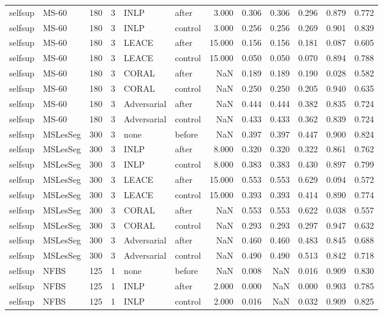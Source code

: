\begin{tabular}{llrrllrrrrrr}
selfsup & MS-60 & 180 & 3 & INLP & after & 3.000 & 0.306 & 0.306 & 0.296 & 0.879 & 0.772 \\
selfsup & MS-60 & 180 & 3 & INLP & control & 3.000 & 0.256 & 0.256 & 0.269 & 0.901 & 0.839 \\
selfsup & MS-60 & 180 & 3 & LEACE & after & 15.000 & 0.156 & 0.156 & 0.181 & 0.087 & 0.605 \\
selfsup & MS-60 & 180 & 3 & LEACE & control & 15.000 & 0.050 & 0.050 & 0.070 & 0.894 & 0.788 \\
selfsup & MS-60 & 180 & 3 & CORAL & after & NaN & 0.189 & 0.189 & 0.190 & 0.028 & 0.582 \\
selfsup & MS-60 & 180 & 3 & CORAL & control & NaN & 0.250 & 0.250 & 0.205 & 0.940 & 0.635 \\
selfsup & MS-60 & 180 & 3 & Adversarial & after & NaN & 0.444 & 0.444 & 0.382 & 0.835 & 0.724 \\
selfsup & MS-60 & 180 & 3 & Adversarial & control & NaN & 0.433 & 0.433 & 0.362 & 0.839 & 0.724 \\
selfsup & MSLesSeg & 300 & 3 & none & before & NaN & 0.397 & 0.397 & 0.447 & 0.900 & 0.824 \\
selfsup & MSLesSeg & 300 & 3 & INLP & after & 8.000 & 0.320 & 0.320 & 0.322 & 0.861 & 0.762 \\
selfsup & MSLesSeg & 300 & 3 & INLP & control & 8.000 & 0.383 & 0.383 & 0.430 & 0.897 & 0.799 \\
selfsup & MSLesSeg & 300 & 3 & LEACE & after & 15.000 & 0.553 & 0.553 & 0.629 & 0.094 & 0.572 \\
selfsup & MSLesSeg & 300 & 3 & LEACE & control & 15.000 & 0.393 & 0.393 & 0.414 & 0.890 & 0.774 \\
selfsup & MSLesSeg & 300 & 3 & CORAL & after & NaN & 0.553 & 0.553 & 0.622 & 0.038 & 0.557 \\
selfsup & MSLesSeg & 300 & 3 & CORAL & control & NaN & 0.293 & 0.293 & 0.297 & 0.947 & 0.632 \\
selfsup & MSLesSeg & 300 & 3 & Adversarial & after & NaN & 0.460 & 0.460 & 0.483 & 0.845 & 0.688 \\
selfsup & MSLesSeg & 300 & 3 & Adversarial & control & NaN & 0.490 & 0.490 & 0.513 & 0.842 & 0.718 \\
selfsup & NFBS & 125 & 1 & none & before & NaN & 0.008 & NaN & 0.016 & 0.909 & 0.830 \\
selfsup & NFBS & 125 & 1 & INLP & after & 2.000 & 0.000 & NaN & 0.000 & 0.903 & 0.785 \\
selfsup & NFBS & 125 & 1 & INLP & control & 2.000 & 0.016 & NaN & 0.032 & 0.909 & 0.825 \\

\end{tabular}
